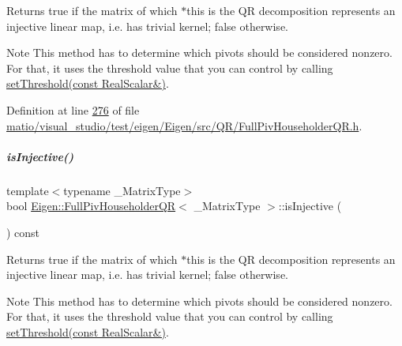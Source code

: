\begin{DoxyReturn}{Returns}
true if the matrix of which $\ast$this is the QR decomposition represents an injective linear map, i.\+e. has trivial kernel; false otherwise.
\end{DoxyReturn}
\begin{DoxyNote}{Note}
This method has to determine which pivots should be considered nonzero. For that, it uses the threshold value that you can control by calling \hyperlink{group___q_r___module_a92277e572bf98245891015d12dd2b602}{set\+Threshold(const Real\+Scalar\&)}. 
\end{DoxyNote}


Definition at line \hyperlink{matio_2visual__studio_2test_2eigen_2_eigen_2src_2_q_r_2_full_piv_householder_q_r_8h_source_l00276}{276} of file \hyperlink{matio_2visual__studio_2test_2eigen_2_eigen_2src_2_q_r_2_full_piv_householder_q_r_8h_source}{matio/visual\+\_\+studio/test/eigen/\+Eigen/src/\+Q\+R/\+Full\+Piv\+Householder\+Q\+R.\+h}.

\mbox{\label{group___q_r___module_a6776788011026b0f63192485a59deaed}} 
\subparagraph{\texorpdfstring{is\+Injective()}{isInjective()}\hspace{0.1cm}{\footnotesize\ttfamily [2/2]}}
{\footnotesize\ttfamily template$<$typename \+\_\+\+Matrix\+Type$>$ \\
bool \hyperlink{group___q_r___module_class_eigen_1_1_full_piv_householder_q_r}{Eigen\+::\+Full\+Piv\+Householder\+QR}$<$ \+\_\+\+Matrix\+Type $>$\+::is\+Injective (\begin{DoxyParamCaption}{ }\end{DoxyParamCaption}) const\hspace{0.3cm}{\ttfamily [inline]}}

\begin{DoxyReturn}{Returns}
true if the matrix of which $\ast$this is the QR decomposition represents an injective linear map, i.\+e. has trivial kernel; false otherwise.
\end{DoxyReturn}
\begin{DoxyNote}{Note}
This method has to determine which pivots should be considered nonzero. For that, it uses the threshold value that you can control by calling \hyperlink{group___q_r___module_a92277e572bf98245891015d12dd2b602}{set\+Threshold(const Real\+Scalar\&)}. 
\end{DoxyNote}


